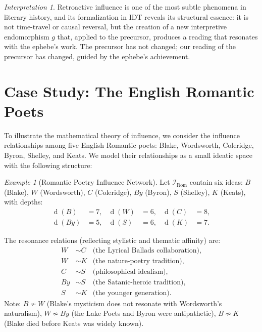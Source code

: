 \documentclass[11pt,openany]{book}
\theoremstyle{definition}
\theoremstyle{plain}
\theoremstyle{remark}
\newtheorem{example}[axiom]{Example}
\newtheorem{interpretation}[axiom]{Interpretation}
\newcommand{\IS}{\mathcal{I}}               %
\newcommand{\res}{\sim}                      %
\newcommand{\depth}{\operatorname{d}}       %
\begin{document}
\begin{interpretation}
Retroactive influence is one of the most subtle phenomena in literary history, and its formalization in IDT reveals its structural essence: it is not time-travel or causal reversal, but the creation of a new interpretive endomorphism $g$ that, applied to the precursor, produces a reading that resonates with the ephebe's work. The precursor has not changed; our reading of the precursor has changed, guided by the ephebe's achievement.
\end{interpretation}

\section{Case Study: The English Romantic Poets}

To illustrate the mathematical theory of influence, we consider the influence relationships among five English Romantic poets: Blake, Wordsworth, Coleridge, Byron, Shelley, and Keats. We model their relationships as a small ideatic space with the following structure:

\begin{example}[Romantic Poetry Influence Network]
Let $\IS_{\text{Rom}}$ contain six ideas: $B$ (Blake), $W$ (Wordsworth), $C$ (Coleridge), $By$ (Byron), $S$ (Shelley), $K$ (Keats), with depths:
\begin{align*}
\depth(B) &= 7, & \depth(W) &= 6, & \depth(C) &= 8, \\
\depth(By) &= 5, & \depth(S) &= 6, & \depth(K) &= 7.
\end{align*}

The resonance relations (reflecting stylistic and thematic affinity) are:
\begin{align*}
W &\res C & \text{(the Lyrical Ballads collaboration)}, \\
W &\res K & \text{(the nature-poetry tradition)}, \\
C &\res S & \text{(philosophical idealism)}, \\
By &\res S & \text{(the Satanic-heroic tradition)}, \\
S &\res K & \text{(the younger generation)}.
\end{align*}
Note: $B \not\res W$ (Blake's mysticism does not resonate with Wordsworth's naturalism), $W \not\res By$ (the Lake Poets and Byron were antipathetic), $B \not\res K$ (Blake died before Keats was widely known).
\end{example}
\end{document}
